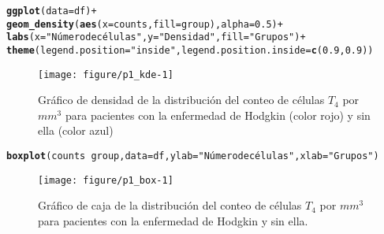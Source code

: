 \documentclass[paper=letter, fontsize=11pt]{scrartcl}\usepackage[]{graphicx}\usepackage[]{xcolor}
\makeatletter
\def\maxwidth{ %
  \ifdim\Gin@nat@width>\linewidth
    \linewidth
  \else
    \Gin@nat@width
  \fi
}
\newcommand{\hlnum}[1]{\textcolor[rgb]{0.686,0.059,0.569}{#1}}%
\newcommand{\hlsng}[1]{\textcolor[rgb]{0.192,0.494,0.8}{#1}}%
\newcommand{\hlopt}[1]{\textcolor[rgb]{0,0,0}{#1}}%
\newcommand{\hldef}[1]{\textcolor[rgb]{0.345,0.345,0.345}{#1}}%
\newcommand{\hlkwc}[1]{\textcolor[rgb]{0.333,0.667,0.333}{#1}}%
\newcommand{\hlkwd}[1]{\textcolor[rgb]{0.737,0.353,0.396}{\textbf{#1}}}%
\newenvironment{kframe}{%
 \def\at@end@of@kframe{}%
 \ifinner\ifhmode%
  \def\at@end@of@kframe{\end{minipage}}%
  \begin{minipage}{\columnwidth}%
 \fi\fi%
 \def\FrameCommand##1{\hskip\@totalleftmargin \hskip-\fboxsep
 \colorbox{shadecolor}{##1}\hskip-\fboxsep
     \hskip-\linewidth \hskip-\@totalleftmargin \hskip\columnwidth}%
 \MakeFramed {\advance\hsize-\width
   \@totalleftmargin\z@ \linewidth\hsize
   \@setminipage}}%
 {\par\unskip\endMakeFramed%
 \at@end@of@kframe}
\newenvironment{knitrout}{}{} %
\numberwithin{equation}{problemcounter} %
\numberwithin{figure}{problemcounter} %
\numberwithin{table}{problemcounter} %
\numberwithin{subsection}{problemcounter}
\makeatother
\begin{document}
\begin{knitrout}
\color{fgcolor}\begin{kframe}
\begin{alltt}
\hlkwd{ggplot}\hldef{(}\hlkwc{data} \hldef{= df)} \hlopt{+}
  \hlkwd{geom_density}\hldef{(}\hlkwd{aes}\hldef{(}\hlkwc{x} \hldef{= counts,} \hlkwc{fill} \hldef{= group),} \hlkwc{alpha} \hldef{=} \hlnum{0.5}\hldef{)} \hlopt{+}
  \hlkwd{labs}\hldef{(}\hlkwc{x} \hldef{=} \hlsng{"Número de células"}\hldef{,} \hlkwc{y} \hldef{=} \hlsng{"Densidad"}\hldef{,} \hlkwc{fill} \hldef{=} \hlsng{"Grupos"}\hldef{)} \hlopt{+}
    \hlkwd{theme}\hldef{(}\hlkwc{legend.position}\hldef{=}\hlsng{"inside"}\hldef{,}\hlkwc{legend.position.inside} \hldef{=} \hlkwd{c}\hldef{(}\hlnum{0.9}\hldef{,} \hlnum{0.9}\hldef{))}
\end{alltt}
\end{kframe}\begin{figure}

{\centering \texttt{[image: figure/p1\_kde-1]} 

}

\caption[Gráfico de densidad de la distribución del conteo de células $T_4$ por $mm^3$ para pacientes con la enfermedad de Hodgkin (color rojo) y sin ella (color azul)]{Gráfico de densidad de la distribución del conteo de células $T_4$ por $mm^3$ para pacientes con la enfermedad de Hodgkin (color rojo) y sin ella (color azul)}\label{fig:p1_kde}
\end{figure}

\end{knitrout}

\begin{knitrout}
\color{fgcolor}\begin{kframe}
\begin{alltt}
\hlkwd{boxplot}\hldef{(counts} \hlopt{~} \hldef{group,} \hlkwc{data}\hldef{=df,} \hlkwc{ylab}\hldef{=}\hlsng{"Número de células"}\hldef{,} \hlkwc{xlab}\hldef{=}\hlsng{"Grupos"}\hldef{)}
\end{alltt}
\end{kframe}\begin{figure}

{\centering \texttt{[image: figure/p1\_box-1]} 

}

\caption[Gráfico de caja de la distribución del conteo de células $T_4$ por $mm^3$ para pacientes con la enfermedad de Hodgkin y sin ella]{Gráfico de caja de la distribución del conteo de células $T_4$ por $mm^3$ para pacientes con la enfermedad de Hodgkin y sin ella.}\label{fig:p1_box}
\end{figure}

\end{knitrout}
\end{document}
